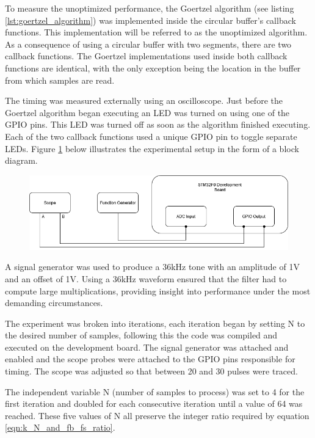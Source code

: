 To measure the unoptimized performance, the Goertzel algorithm (see listing \ref{lst:goertzel_algorithm}) was implemented inside the circular buffer's callback functions. This implementation will be referred to as the unoptimized algorithm. As a consequence of using a circular buffer with two segments, there are two callback functions. The Goertzel implementations used inside both callback functions are identical, with the only exception being the location in the buffer from which samples are read.

The timing was measured externally using an oscilloscope. Just before the Goertzel algorithm began executing an LED was turned on using one of the GPIO pins. This LED was turned off as soon as the algorithm finished executing. Each of the two callback functions used a unique GPIO pin to toggle separate LEDs. Figure \ref{fig:goertzel_optimization_experiemnt} below illustrates the experimental setup in the form of a block diagram.

\begin{figure}[H]
	\centering
	\includegraphics[width=.9\linewidth]{figures/experimentation/goertzel_speed_test_diagram.png}
	\label{fig:goertzel_optimization_experiemnt}
\end{figure}

A signal generator was used to produce a 36kHz tone with an amplitude of 1V and an offset of 1V. Using a 36kHz waveform ensured that the filter had to compute large multiplications, providing insight into performance under the most demanding circumstances.

The experiment was broken into iterations, each iteration began by setting N to the desired number of samples, following this the code was compiled and executed on the development board. The signal generator was attached and enabled and the scope probes were attached to the GPIO pins responsible for timing. The scope was adjusted so that between 20 and 30 pulses were traced. 

The independent variable N (number of samples to process) was set to 4 for the first iteration and doubled for each consecutive iteration until a value of 64 was reached. These five values of N all preserve the integer ratio required by equation \ref{eqn:k_N_and_fb_fs_ratio}.

